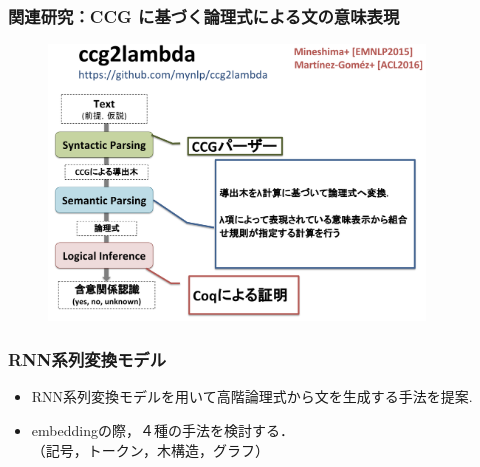\documentclass[dvipdfmx]{beamer}
\begin{document}
\begin{frame}
\frametitle{関連研究：CCG に基づく論理式による文の意味表現}
\begin{center}
\begin{figure}[h]
	\includegraphics[width=10cm]{c2l.png}
        \label{fig:c2l}
\end{figure}
\end{center}

\end{frame}




\begin{frame}
\frametitle{RNN系列変換モデル}
\begin{center}
\end{center}

\begin{itemize}
  \item {\color{berry}RNN系列変換モデル}を用いて高階論理式から文を生成する手法を提案.
  \item embeddingの際，４種の手法を検討する．\\（記号，トークン，木構造，グラフ）　
\end{itemize}


\end{frame}
\end{document}
